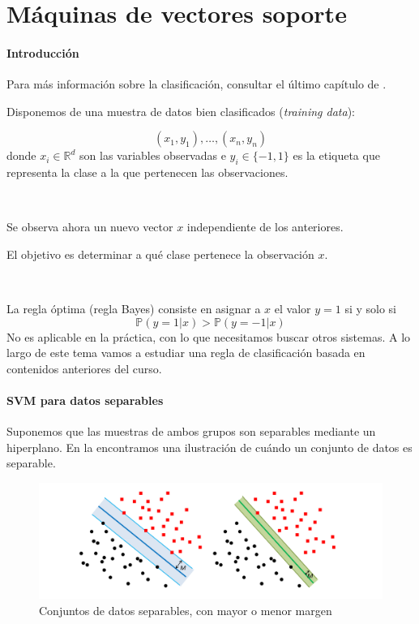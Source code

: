 \section{Máquinas de vectores soporte}

\paragraph{Introducción}

Para más información sobre la clasificación, consultar el último capítulo de \citep{ApuntesEstII}.
%

Disponemos de una muestra de datos bien clasificados (\textit{training data}):

\[
(x_1,y_1),\ldots, (x_n,y_n)
\]
donde $x_i\in \mathbb{R}^d$ son las variables observadas e $y_i\in\{-1,1\}$ es la etiqueta que representa la clase a la que pertenecen las observaciones.

\

Se observa ahora un nuevo vector $x$ independiente de los anteriores.

El objetivo es determinar a qué clase pertenece la observación $x$.

\

La regla óptima (regla Bayes) consiste en asignar a $x$ el valor $y=1$ si y solo si
\[
\mathbb{P}(y=1| x) > \mathbb{P}(y=-1|x)
\]
No es aplicable en la práctica, con lo que necesitamos buscar otros sistemas. 
%
A lo largo de este tema vamos a estudiar una regla de clasificación basada en contenidos anteriores del curso.

\paragraph{SVM para datos separables}

Suponemos que las muestras de ambos grupos son separables mediante un hiperplano. 
%
En la  encontramos una ilustración de cuándo un conjunto de datos es separable.

\begin{figure}[hbtp]
\centering
\includegraphics[scale=0.4]{img/margen}
\caption{Conjuntos de datos separables, con mayor o menor margen}
\label{fig:datosseparables}
\end{figure}

